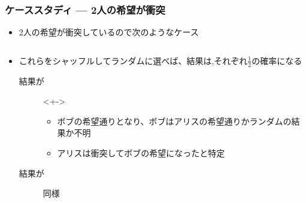 \begin{frame}
  \frametitle{ケーススタディ --- 2人の希望が衝突}

  \begin{itemize}
    \item<+-> 2人の希望が衝突しているので次のようなケース
      \begin{columns}
        \begin{column}{0.5\textwidth}
        \end{column}
        \begin{column}{0.5\textwidth}
        \end{column}
      \end{columns}

    \item<+-> これらをシャッフルしてランダムに選べば、結果は\heartcard,\clubcard それぞれ$\frac{1}{2}$の確率になる
    \begin{description}
      \item[結果が\clubcard]<+->\mbox{}\\
      \begin{itemize}
        \item ボブの希望通りとなり、ボブはアリスの希望通りかランダムの結果か不明
        \item アリスは衝突してボブの希望\clubcard になったと特定
      \end{itemize}

      \item[結果が\heartcard] 同様
    \end{description}
  \end{itemize}
\end{frame}

